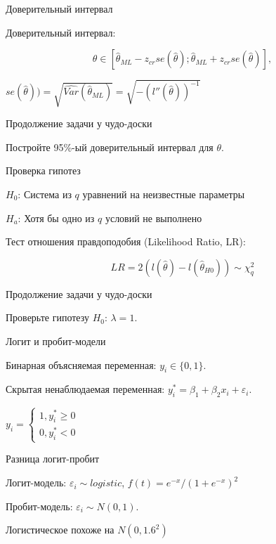 \documentclass[ignorenonframetext,]{beamer}
\begin{document}
\begin{frame}{Доверительный интервал}

Доверительный интервал:

\[
\theta \in [\hat{\theta}_{ML}-z_{cr}se(\hat{\theta});\hat{\theta}_{ML}+z_{cr}se(\hat{\theta})],
\]

$se(\hat{\theta}))=\sqrt{\widehat{Var}(\hat{\theta}_{ML})}=\sqrt{-(l''(\hat{\theta}))^{-1}}$

\end{frame}

\begin{frame}{Продолжение задачи у чудо-доски}

Постройте 95\%-ый доверительный интервал для $\theta$.

\end{frame}

\begin{frame}{Проверка гипотез}

$H_0$: Система из $q$ уравнений на неизвестные параметры

$H_a$: Хотя бы одно из $q$ условий не выполнено

Тест отношения правдоподобия (Likelihood Ratio, LR):

\[
LR=2(l(\hat{\theta})-l(\hat{\theta}_{H0})) \sim \chi^2_q
\]

\end{frame}

\begin{frame}{Продолжение задачи у чудо-доски}

Проверьте гипотезу $H_0$: $\lambda=1$.

\end{frame}

\begin{frame}{Логит и пробит-модели}

Бинарная объясняемая переменная: $y_i \in \{0,1\}$.

Скрытая ненаблюдаемая переменная:
$y^*_i=\beta_1 +\beta_2 x_i +\varepsilon_i$.

$y_i=\begin{cases} 1, y^*_i \geq 0 \\ 0, y^*_i <0 \end{cases}$

\end{frame}

\begin{frame}{Разница логит-пробит}

Логит-модель: $\varepsilon_i \sim logistic$, $f(t)=e^{-x}/(1+e^{-x})^2$

Пробит-модель: $\varepsilon_i \sim N(0,1)$.

Логистическое похоже на $N(0,1.6^2)$

\end{frame}
\end{document}
